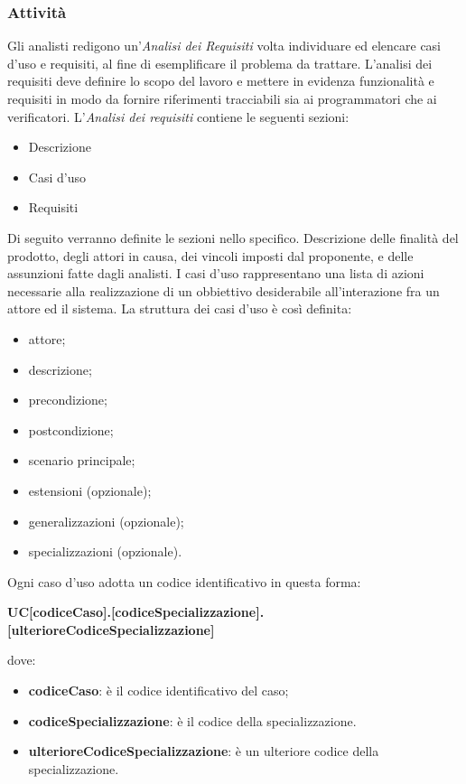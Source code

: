 		\subsubsection{Attività}
		Gli analisti redigono un'\textit{Analisi dei Requisiti} volta  individuare ed elencare casi d'uso e requisiti, al fine di esemplificare il problema da trattare.
		L'analisi dei requisiti deve definire lo scopo del lavoro e mettere in evidenza funzionalità e requisiti in modo da fornire riferimenti tracciabili sia ai programmatori che ai verificatori.
		L'\textit{Analisi dei requisiti} contiene le seguenti sezioni:
		\begin{itemize}
		    \item Descrizione
		    \item Casi d'uso
		    \item Requisiti
		\end{itemize}
		Di seguito verranno definite le sezioni nello specifico.
		Descrizione delle finalità del prodotto, degli attori in causa, dei vincoli imposti dal proponente, e delle assunzioni fatte dagli analisti.
		I casi d'uso rappresentano una lista di azioni necessarie alla realizzazione di un obbiettivo desiderabile all'interazione fra un attore ed il sistema.
		La struttura dei casi d'uso è così definita:
		\begin{itemize}
		    \item attore;
		    \item descrizione;
		    \item precondizione;
		    \item postcondizione;
		    \item scenario principale;
		    \item estensioni (opzionale);
		    \item generalizzazioni (opzionale);
		    \item specializzazioni (opzionale).
		\end{itemize}
		Ogni caso d'uso adotta un codice identificativo in questa forma:\\
	    \centerline{\textbf{UC[codiceCaso].[codiceSpecializzazione].[ulterioreCodiceSpecializzazione]}}
        dove:
	    \begin{itemize}
	        \item \textbf{codiceCaso}: è il codice identificativo del caso;
	        \item \textbf{codiceSpecializzazione}: è il codice della specializzazione.
	        \item \textbf{ulterioreCodiceSpecializzazione}: è un ulteriore codice della specializzazione.
	    \end{itemize}
